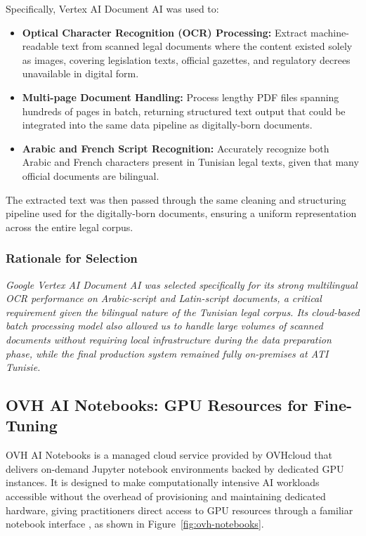 Specifically, Vertex AI Document AI was used to:

\begin{itemize}
    \item \textbf{Optical Character Recognition (OCR) Processing:} Extract machine-readable text from scanned legal
    documents where the content existed solely as images, covering legislation texts,
    official gazettes, and regulatory decrees unavailable in digital form.

    \item \textbf{Multi-page Document Handling:} Process lengthy \ac{PDF} files
    spanning hundreds of pages in batch, returning structured text output that could
    be integrated into the same data pipeline as digitally-born documents.

    \item \textbf{Arabic and French Script Recognition:} Accurately recognize both
    Arabic and French characters present in Tunisian legal texts, given that many
    official documents are bilingual.
\end{itemize}

The extracted text was then passed through the same cleaning and structuring pipeline
used for the digitally-born documents, ensuring a uniform representation across the
entire legal corpus.

\subsubsection*{Rationale for Selection}

{\itshape Google Vertex AI Document AI was selected specifically for its strong multilingual
\ac{OCR} performance on Arabic-script and Latin-script documents, a critical
requirement given the bilingual nature of the Tunisian legal corpus. Its cloud-based
batch processing model also allowed us to handle large volumes of scanned documents
without requiring local infrastructure during the data preparation phase, while the
final production system remained fully on-premises at \ac{ATI} Tunisie.}

\subsection{OVH AI Notebooks: GPU Resources for Fine-Tuning}

OVH AI Notebooks is a managed cloud service provided by OVHcloud that delivers
on-demand Jupyter notebook environments backed by dedicated \ac{GPU} instances.
It is designed to make computationally intensive \ac{AI} workloads accessible
without the overhead of provisioning and maintaining dedicated hardware, giving
practitioners direct access to \ac{GPU} resources through a familiar notebook
interface \cite{ovh2024notebooks}, as shown in Figure~\ref{fig:ovh-notebooks}.

